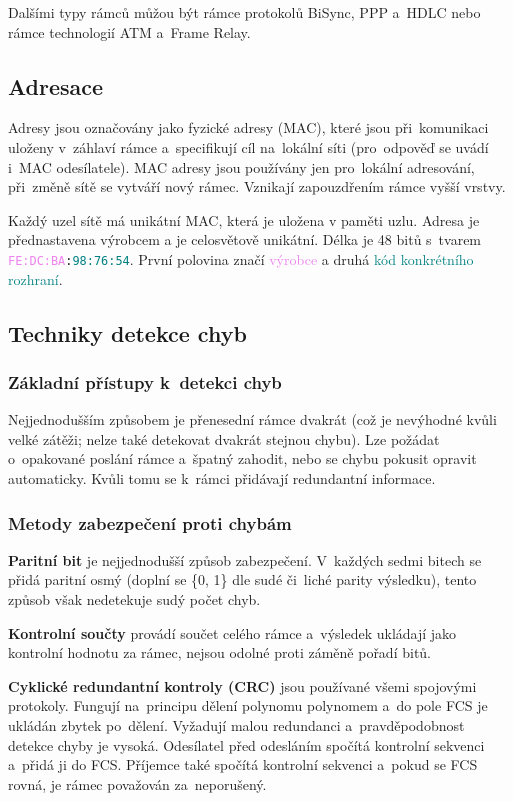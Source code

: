 Dalšími typy rámců můžou být rámce protokolů BiSync, PPP a~HDLC nebo rámce technologií ATM a~Frame Relay.

\subsection{Adresace}

Adresy jsou označovány jako fyzické adresy (MAC), které jsou při~komunikaci uloženy v~záhlaví rámce a~specifikují cíl na~lokální síti (pro~odpověď se uvádí i~MAC odesílatele). MAC adresy jsou používány jen pro~lokální adresování, při~změně sítě se vytváří nový rámec. Vznikají zapouzdřením rámce vyšší vrstvy.

Každý uzel sítě má unikátní MAC, která je uložena v paměti uzlu. Adresa je přednastavena výrobcem a je celosvětově unikátní. Délka je 48 bitů s~tvarem \texttt{\textcolor{violet}{FE:DC:BA}:\textcolor{teal}{98:76:54}}. První polovina značí \textcolor{violet}{výrobce} a druhá \textcolor{teal}{kód konkrétního rozhraní}.

\subsection{Techniky detekce chyb}

\subsubsection{Základní přístupy k~detekci chyb}

Nejjednodušším způsobem je přenesední rámce dvakrát (což je nevýhodné kvůli velké zátěži; nelze také detekovat dvakrát stejnou chybu). Lze požádat o~opakované poslání rámce a~špatný zahodit, nebo se chybu pokusit opravit automaticky. Kvůli tomu se k~rámci přidávají redundantní informace.

\subsubsection{Metody zabezpečení proti chybám}

\textbf{Paritní bit} je nejjednodušší způsob zabezpečení. V~každých sedmi bitech se přidá paritní osmý (doplní se \{0, 1\} dle sudé či~liché parity výsledku), tento způsob však nedetekuje sudý počet chyb.

\textbf{Kontrolní součty} provádí součet celého rámce a~výsledek ukládají jako kontrolní hodnotu za rámec, nejsou odolné proti záměně pořadí bitů.

\textbf{Cyklické redundantní kontroly (CRC)} jsou používané všemi spojovými protokoly. Fungují na~principu dělení polynomu polynomem a~do pole FCS je ukládán zbytek po~dělení. Vyžadují malou redundanci a~pravděpodobnost detekce chyby je vysoká. Odesílatel před odesláním spočítá kontrolní sekvenci a~přidá ji do FCS. Příjemce také spočítá kontrolní sekvenci a~pokud se FCS rovná, je rámec považován za~neporušený.

